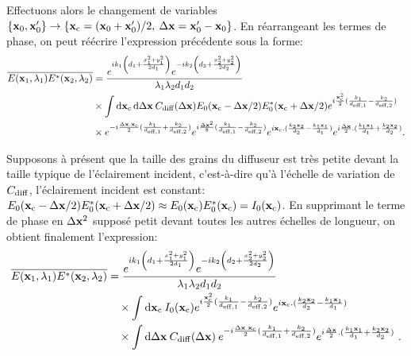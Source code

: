 Effectuons alors le changement de variables $\lbrace \mathbf{x}_0,\mathbf{x}_0' \rbrace\rightarrow \lbrace \mathbf{x}_{\mathrm{c}}=(\mathbf{x}_0+\mathbf{x}_0')/2 ,\: \Delta\mathbf{x}=\mathbf{x}_0'-\mathbf{x}_0 \rbrace$. En réarrangeant les termes de phase, on peut réécrire l'expression précédente sous la forme:
\begin{align}
\overline{E(\mathbf{x}_1,\lambda_1)E^*(\mathbf{x}_2,\lambda_2)} &= \frac{e^{ik_1\left( d_1 + \frac{x_1^2+y_1^2}{2d_1} \right)} e^{-ik_2 \left( d_2 + \frac{x_2^2+y_2^2}{2d_2}\right)}}{\lambda_1 \lambda_2 d_1 d_2} \\
\nonumber & \times \int{\mathop{}\mathopen{}\mathrm{d}\mathbf{x}_{\mathrm{c}}\mathop{}\mathopen{}\mathrm{d}\Delta\mathbf{x}\: C_{\mathrm{diff}}(\Delta\mathbf{x}) E_0(\mathbf{x}_{\mathrm{c}}-\Delta\mathbf{x}/2)E_0^*(\mathbf{x}_{\mathrm{c}}+\Delta\mathbf{x}/2)} e^{i\frac{\mathbf{x}_{\mathrm{c}}^2}{2} (\frac{k_1}{d_{\mathrm{eff,1}}} - \frac{k_2}{d_{\mathrm{eff,2}}})}\\
\nonumber & \times  e^{-i \frac{\Delta\mathbf{x} . \mathbf{x}_{\mathrm{c}}}{2} ( \frac{k_1}{d_{\mathrm{eff,1}}} + \frac{k_2}{d_{\mathrm{eff,2}}})} e^{i \frac{\Delta\mathbf{x}^2}{8}(\frac{k_1}{d_{\mathrm{eff,1}}} - \frac{k_2}{d_{\mathrm{eff,2}}})} e^{i\mathbf{x}_{\mathrm{c}}.(\frac{k_2 \mathbf{x}_2}{d_2} - \frac{k_1 \mathbf{x}_1}{d_1})} e^{i\frac{\Delta\mathbf{x}}{2} . (\frac{k_1 \mathbf{x}_1}{d_1} + \frac{k_2 \mathbf{x}_2}{d_2})} \text{.}
\end{align}

Supposons à présent que la taille des grains du diffuseur est très petite devant la taille typique de l'éclairement incident, c'est-à-dire qu'à l'échelle de variation de $C_{\mathrm{diff}}$, l'éclairement incident est constant: $E_0(\mathbf{x}_{\mathrm{c}}-\Delta\mathbf{x}/2) E_0^*(\mathbf{x}_{\mathrm{c}}+\Delta\mathbf{x}/2) \approx E_0(\mathbf{x}_{\mathrm{c}}) E_0^*(\mathbf{x}_{\mathrm{c}}) = I_0(\mathbf{x}_{\mathrm{c}})$. En supprimant le terme de phase en $\Delta\mathbf{x}^2$ supposé petit devant toutes les autres échelles de longueur, on obtient finalement l'expression:
\begin{align}
\overline{E(\mathbf{x}_1,\lambda_1)E^*(\mathbf{x}_2,\lambda_2)} &= \frac{e^{ik_1\left( d_1 + \frac{x_1^2+y_1^2}{2d_1} \right)} e^{-ik_2 \left( d_2 + \frac{x_2^2+y_2^2}{2d_2}\right)}}{\lambda_1 \lambda_2 d_1 d_2} \\
\nonumber & \quad \times \int{\mathop{}\mathopen{}\mathrm{d}\mathbf{x}_{\mathrm{c}}\: I_0(\mathbf{x}_{\mathrm{c}}) e^{i\frac{\mathbf{x}_{\mathrm{c}}^2}{2}(\frac{k_1}{d_{\mathrm{eff,1}}} - \frac{k_2}{d_{\mathrm{eff,2}}})} e^{i \mathbf{x}_{\mathrm{c}}. (\frac{k_2 \mathbf{x}_2}{d_2}-\frac{k_1 \mathbf{x}_1}{d_1})}} \\
\nonumber & \quad \times \int{\mathop{}\mathopen{}\mathrm{d}\Delta\mathbf{x}\: C_{\mathrm{diff}}(\Delta\mathbf{x}) \: e^{-i\frac{\Delta\mathbf{x}. \mathbf{x}_{\mathrm{c}}}{2}(\frac{k_1}{d_{\mathrm{eff,1}}} + \frac{k_2}{d_{\mathrm{eff,2}}})} e^{i\frac{\Delta\mathbf{x}}{2}. (\frac{k_1 \mathbf{x}_1}{d_1} +\frac{k_2 \mathbf{x}_2}{d_2})}} \text{ .}
\label{eq:fonction_correlation_generale}
\end{align}




